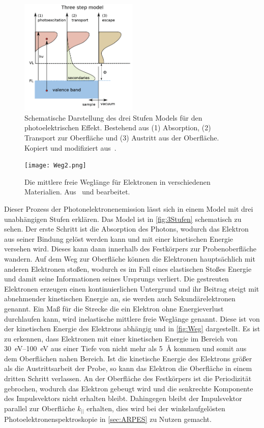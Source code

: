         \begin{figure}
            \centering
            \includegraphics[width=0.5\textwidth]{3Stufen}
            \caption{Schematische Darstellung des drei Stufen Models für den photoelektrischen Effekt.
            Bestehend aus (1) Absorption, (2) Transport zur Oberfläche und (3) Austritt aus der Oberfläche.
            Kopiert und modifiziert aus~\cite{zhang_synchrotron_2018}.}
            \label{fig:3Stufen}
        \end{figure}
        \begin{figure}
            \centering
            \texttt{[image: Weg2.png]}
            \caption{Die mittlere freie Weglänge für Elektronen in verschiedenen Materialien. Aus~\cite{Hüfner} und bearbeitet.}
            \label{fig:Weg}
        \end{figure}
        Dieser Prozess der Photonelektronenemission lässt sich in einem Model mit drei unabhängigen Stufen erklären.
        Das Model ist in \autoref{fig:3Stufen} schematisch zu sehen.
        Der erste Schritt ist die Absorption des Photons, wodurch das Elektron aus seiner Bindung gelöst werden kann und mit einer kinetischen Energie versehen wird.
        Dieses kann dann innerhalb des Festkörpers zur Probenoberfläche wandern.
        Auf dem Weg zur Oberfläche können die  Elektronen hauptsächlich mit anderen Elektronen stoßen, wodurch es im Fall eines elastischen Stoßes Energie und damit seine Informationen seines Ursprungs verliert.
        Die gestreuten Elektronen erzeugen einen kontinuierlichen Untergrund und ihr Beitrag steigt mit abnehmender kinetischen Energie an, sie werden auch Sekundärelektronen genannt.
        Ein Maß für die Strecke die ein Elektron ohne Energieverlust durchlaufen kann, wird inelastische mittlere freie Weglänge genannt.
        Diese ist von der kinetischen Energie des Elektrons abhängig und in \autoref{fig:Weg} dargestellt.
        Es ist zu erkennen, dass Elektronen mit einer kinetischen Energie im Bereich von \SIrange{30}{100}{\electronvolt} aus einer Tiefe von nicht mehr als \SI{5}{\angstrom} kommen und somit aus dem Oberflächen nahen Bereich.
        Ist die kinetische Energie des Elektrons größer als die Austrittsarbeit der Probe, so kann das Elektron die Oberfläche in einem dritten Schritt verlassen.
        An der Oberfläche des Festkörpers ist die Periodizität gebrochen, wodurch das Elektron gebeugt wird und die senkrechte Komponente des Impulsvektors nicht erhalten bleibt.
        Dahingegen bleibt der Impulsvektor parallel zur Oberfläche $k_{||}$ erhalten, dies wird bei der winkelaufgelösten Photoelektronenspektroskopie in \autoref{sec:ARPES} zu Nutzen gemacht.

